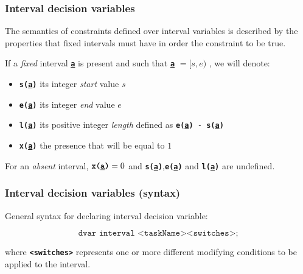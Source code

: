 \begin{frame} \frametitle{Interval decision variables}
\pause
The semantics of constraints defined over interval variables is described by the properties that fixed intervals must have in order the constraint to be true.

\pause\medskip

If a \emph{fixed} interval \textbf{\texttt{\underline{a}}} is present and such that \textbf{\texttt{\underline{a}}} $= [s,e)$ , we will denote:\pause
\begin{itemize}[<+->]
\item \textbf{\texttt{s(\underline{a})}} its integer \emph{start} value $s$
\item \textbf{\texttt{e(\underline{a})}} its integer \emph{end} value $e$
\item \textbf{\texttt{l(\underline{a})}} its positive integer \emph{length} defined as \texttt{\textbf{e(\underline{a})} - \textbf{s(\underline{a})}} 
\item \textbf{\texttt{x(\underline{a})}} the presence that will be equal to $1$
\end{itemize}

\pause\medskip

For an \emph{absent} interval, $\textbf{\texttt{x(\underline{a})}} = 0$ and \textbf{\texttt{s(\underline{a})}},\textbf{\texttt{e(\underline{a})}} and \textbf{\texttt{l(\underline{a})}} are undefined.

\end{frame}

\begin{frame} \frametitle{Interval decision variables (syntax)}
\pause
General syntax for declaring interval decision variable:

\pause\medskip

\begin{equation*}
\texttt{dvar interval <taskName><switches>;} 
\end{equation*}

\pause\medskip

where \textbf{\texttt{<switches>}} represents one or more different modifying conditions to be applied to the interval. 

\end{frame}

